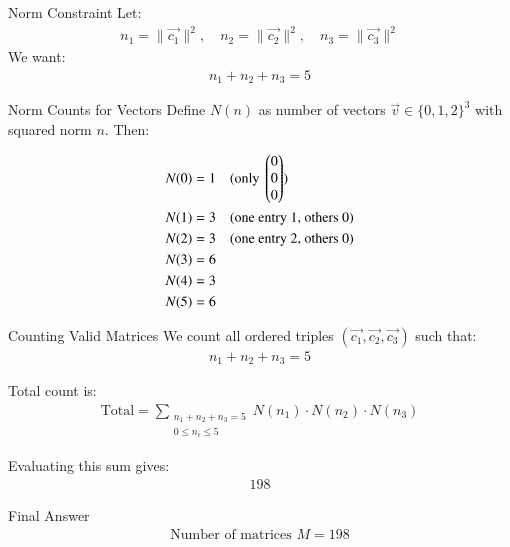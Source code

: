 \documentclass{beamer}
\begin{document}

\begin{frame}{Norm Constraint}
Let:
\begin{align}
n_1 = \|\vec{c_1}\|^2, \quad n_2 = \|\vec{c_2}\|^2, \quad n_3 = \|\vec{c_3}\|^2
\end{align}
We want:
\begin{align}
n_1 + n_2 + n_3 = 5
\end{align}
\end{frame}


\begin{frame}{Norm Counts for Vectors}
Define \( N(n) \) as number of vectors \( \vec{v} \in \{0,1,2\}^3 \) with squared norm \( n \). Then:

\begin{align}
N(0) &= 1 \quad \text{(only } \begin{pmatrix}0\\0\\0\end{pmatrix}) \\
N(1) &= 3 \quad \text{(one entry 1, others 0)} \\
N(2) &= 3 \quad \text{(one entry 2, others 0)} \\
N(3) &= 6 \\
N(4) &= 3 \\
N(5) &= 6
\end{align}
\end{frame}


\begin{frame}{Counting Valid Matrices}
We count all ordered triples \( (\vec{c_1}, \vec{c_2}, \vec{c_3}) \) such that:
\begin{align}
n_1 + n_2 + n_3 = 5
\end{align}

Total count is:
\begin{align}
\text{Total} = \sum_{\substack{n_1 + n_2 + n_3 = 5 \\ 0 \leq n_i \leq 5}} N(n_1) \cdot N(n_2) \cdot N(n_3)
\end{align}

Evaluating this sum gives:
\begin{align}
\boxed{198}
\end{align}
\end{frame}


\begin{frame}{Final Answer}
\begin{align}
\boxed{\text{Number of matrices } M = 198}
\end{align}
\end{frame}
\end{document}
